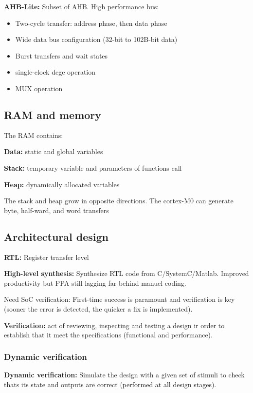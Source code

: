\textbf{AHB-Lite:} Subset of AHB. High performance bus:
\begin{itemize}
  \item Two-cycle transfer: address phase, then data phase
  \item Wide data bus configuration (32-bit to 102B-bit data)
  \item Burst transfers and wait states
  \item single-clock dege operation
  \item MUX operation
\end{itemize}


\subsection{RAM and memory}
The RAM contains:

\textbf{Data:} static and global variables

\textbf{Stack:} temporary variable and parameters of functions call

\textbf{Heap:} dynamically allocated variables

The stack and heap grow in opposite directions. The cortex-M0 can generate byte, half-ward, and word transfers

\subsection{Architectural design}

\textbf{RTL:} Register transfer level

\textbf{High-level synthesis:} Synthesize RTL code from C/SystemC/Matlab. Improved productivity but PPA still lagging far behind manuel coding.
\bigbreak

Need SoC verification: First-time success is paramount and verification is key (sooner the error is detected, the quicker a fix is implemented).

\textbf{Verification:} act of reviewing, inspecting and testing a design ir order to establish that it meet the specifications (functional and performance).

\subsubsection{Dynamic verification}
\textbf{Dynamic verification:} Simulate the design with a given set of stimuli to check thats its state and outputs are correct (performed at all design stages).

